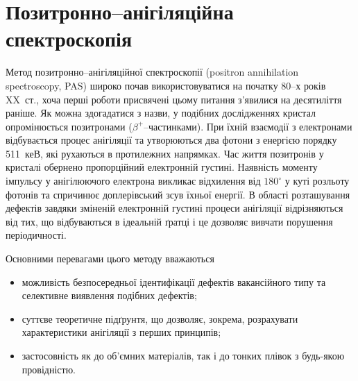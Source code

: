 \documentclass[10pt,a5paper,titlepage,oneside]{book}
\numberwithin{equation}{part}
\renewcommand{\theequation}{\thechapter.\arabic{equation}}
\begin{document}








\renewcommand\bibname{Рекомендована та використана література}

\vspace{-5cm}
\setcounter{page}{3}

\clearpage
 \tableofcontents













\chapter{Позитронно--анігіляційна спектроскопія}\label{chapPAS}

Метод позитронно--анігіляційної спектроскопії
(positron annihilation spectroscopy, PAS)
широко почав використовуватися на початку 80--х років XX~ст.,
хоча перші роботи присвячені цьому питання з'явилися на десятиліття раніше.
Як можна здогадатися з назви, у подібних дослідженнях кристал опромінюється позитронами ($\beta^+$--частинками).
При їхній взаємодії з електронами відбувається процес анігіляції
та утворюються два фотони з енергією порядку 511~кеВ,
які рухаються в протилежних напрямках.
Час життя позитронів у кристалі обернено пропорційний електронній густині.
Наявність моменту імпульсу у анігілюючого електрона викликає відхилення
від $180^\circ$ у куті розльоту фотонів та спричинює доплерівський зсув їхньої енергії.
В області розташування дефектів завдяки зміненій електронній густині процеси анігіляції відрізняються від тих,
що відбуваються в ідеальній ґратці і це дозволяє вивчати порушення періодичності.

Основними перевагами цього методу вважаються
\begin{itemize}[leftmargin=0em,itemindent=1.5em]
\item можливість безпосередньої ідентифікації дефектів вакансійного типу та
селективне виявлення подібних дефектів;
\item суттєве теоретичне підґрунтя, що дозволяє, зокрема, розрахувати характеристики анігіляції з перших принципів;
\item застосовність як до об'ємних матеріалів, так і до тонких плівок з будь-якою провідністю.
\end{itemize}
\end{document}
